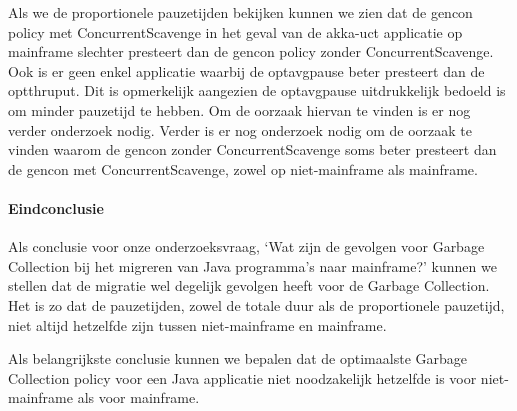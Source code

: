 Als we de proportionele pauzetijden bekijken kunnen we zien dat de gencon policy met ConcurrentScavenge in het geval van de akka-uct applicatie op mainframe slechter presteert dan de gencon policy zonder ConcurrentScavenge.
Ook is er geen enkel applicatie waarbij de optavgpause beter presteert dan de optthruput.
Dit is opmerkelijk aangezien de optavgpause uitdrukkelijk bedoeld is om minder pauzetijd te hebben.
Om de oorzaak hiervan te vinden is er nog verder onderzoek nodig.
Verder is er nog onderzoek nodig om de oorzaak te vinden waarom de gencon zonder ConcurrentScavenge soms beter presteert dan de gencon met ConcurrentScavenge, zowel op niet-mainframe als mainframe.


\paragraph{Eindconclusie}

Als conclusie voor onze onderzoeksvraag, `Wat zijn de gevolgen voor Garbage Collection bij het migreren van Java programma's naar mainframe?' kunnen we stellen dat de migratie wel degelijk gevolgen heeft voor de Garbage Collection.
Het is zo dat de pauzetijden, zowel de totale duur als de proportionele pauzetijd, niet altijd hetzelfde zijn tussen niet-mainframe en mainframe.


Als belangrijkste conclusie kunnen we bepalen dat de optimaalste Garbage Collection policy voor een Java applicatie niet noodzakelijk hetzelfde is voor niet-mainframe als voor mainframe.


